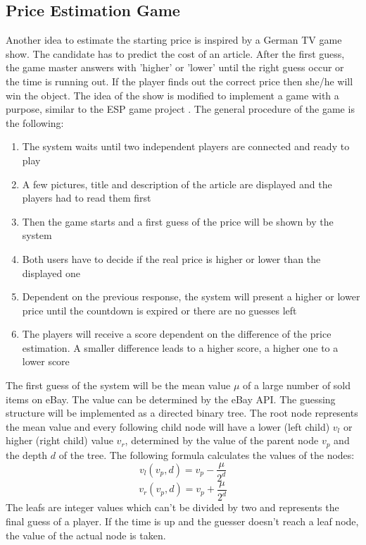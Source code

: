 \subsection{Price Estimation Game}
Another idea to estimate the starting price is inspired by a German TV game show. The candidate has to predict the cost of an article. After the first guess, the game master answers with 'higher' or 'lower' until the right guess occur or the time is running out. If the player finds out the correct price then she/he will win the object.  
The idea of the show is modified to implement a game with a purpose, similar to the ESP game project \cite{esp}. The general procedure of the game is the following: 
\begin{enumerate}
	\item The system waits until two independent players are connected and ready to play 
	\item A few pictures, title and description of the article are displayed and the players had to read them first 
	\item Then the game starts and a first guess of the price will be shown by the system 
	\item Both users have to decide if the real price is higher or lower than the displayed one 
	\item Dependent on the previous response, the system will present a higher or lower price until the countdown is expired or there are no guesses left 
	\item The players will receive a score dependent on the difference of the price estimation. A smaller difference leads to a higher score, a higher one to a lower score 
\end{enumerate}
The first guess of the system will be the mean value \( \mu \) of a large number of sold items on eBay. The value can be determined by the eBay API. The guessing structure will be implemented as a directed binary tree. The root node represents the mean value and every following child node will have a lower (left child) \( v_l \) or higher (right child) value  \( v_r \), determined by the value of the parent node  \( v_p \) and the depth  \( d \) of the tree. The following formula calculates the values  of the nodes: 
\begin{equation}
v_l(v_p,d) = v_p - \frac{\mu}{2^d}
\end{equation}
\begin{equation}
v_r(v_p,d) = v_p + \frac{\mu}{2^d}
\end{equation}
The leafs are integer values which can't be divided by two and represents the final guess of a player. If the time is up and the guesser doesn't reach a leaf node, the value of the actual node is taken. 
